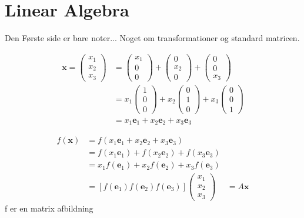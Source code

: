 \chapter {Linear Algebra} 
Den Første side er bare noter...
Noget om transformationer og standard matricen.

\begin{align*}
    \textbf{x}=
    \begin{pmatrix}x_1 
        \\x_2 \\ x_3 
    \end{pmatrix} &= 
    \begin{pmatrix}
        x_1 \\ 0 \\ 0  
    \end{pmatrix} + 
    \begin{pmatrix}
        0 \\ x_2 \\ 0  
    \end{pmatrix} + 
    \begin{pmatrix}
        0 \\ 0 \\ x_3  
    \end{pmatrix}\\ &= x_1  
   \begin{pmatrix}
        1 \\ 0\\ 0  
   \end{pmatrix}+ x_2 
   \begin{pmatrix}
        0 \\ 1 \\ 0  
   \end{pmatrix} + x_3 
   \begin{pmatrix}
        0 \\ 0 \\ 1  
   \end{pmatrix} \\ &= x_1 \textbf{e}_1 + x_2\textbf{e}_2+x_3 \textbf{e}_3
\end{align*}

\begin{align*}
f(\textbf{x})&=f(x_1 \textbf{e}_1 + x_2\textbf{e}_2+x_3 \textbf{e}_3)\\ 
&= f(x_1 \textbf{e}_1) + f(x_2 \textbf{e}_2) + f(x_3 \textbf{e}_3) \\
&=x_1 f(\textbf{e}_1) + x_2 f(\textbf{e}_2) + x_3 f(\textbf{e}_3)
\\ &= [f(\textbf{e}_1) f(\textbf{e}_2 ) f(\textbf{e}_3)] 
\begin{pmatrix}
    x_1 \\x_2 \\ x_3 
\end{pmatrix} &= A \textbf{x}
\end{align*}
f er en matrix afbildning



